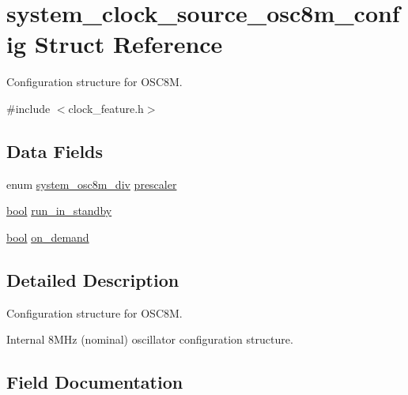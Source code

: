 \hypertarget{structsystem__clock__source__osc8m__config}{}\section{system\+\_\+clock\+\_\+source\+\_\+osc8m\+\_\+config Struct Reference}
\label{structsystem__clock__source__osc8m__config}


Configuration structure for O\+S\+C8M.  




{\ttfamily \#include $<$clock\+\_\+feature.\+h$>$}

\subsection*{Data Fields}
\begin{DoxyCompactItemize}
\item 
enum \mbox{\hyperlink{group__asfdoc__sam0__system__clock__group_ga1ee1b0be167bd253038400d9c6d0cbef}{system\+\_\+osc8m\+\_\+div}} \mbox{\hyperlink{structsystem__clock__source__osc8m__config_ad53a17fe54bf225d744012928394e50b}{prescaler}}
\item 
\mbox{\hyperlink{group__group__sam0__utils_ga97a80ca1602ebf2303258971a2c938e2}{bool}} \mbox{\hyperlink{structsystem__clock__source__osc8m__config_a514964d5c2a8da4dd96bac82a53477f2}{run\+\_\+in\+\_\+standby}}
\item 
\mbox{\hyperlink{group__group__sam0__utils_ga97a80ca1602ebf2303258971a2c938e2}{bool}} \mbox{\hyperlink{structsystem__clock__source__osc8m__config_a23620c12634b9230d2325ec5c245cf32}{on\+\_\+demand}}
\end{DoxyCompactItemize}


\subsection{Detailed Description}
Configuration structure for O\+S\+C8M. 

Internal 8M\+Hz (nominal) oscillator configuration structure. 

\subsection{Field Documentation}
\mbox{\label{structsystem__clock__source__osc8m__config_a23620c12634b9230d2325ec5c245cf32}} 
